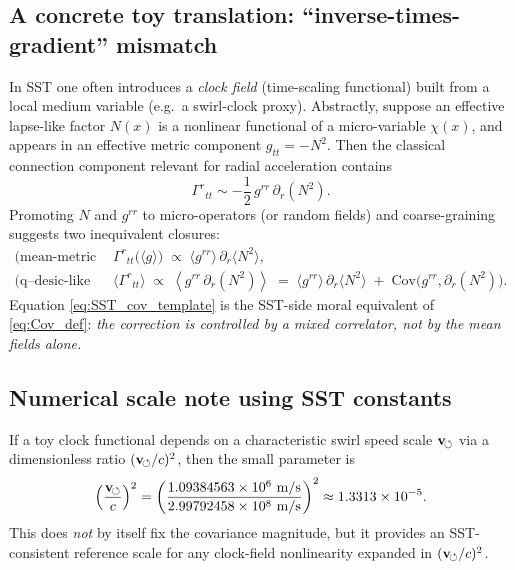 \documentclass[11pt,a4paper]{article}
\theoremstyle{thmstyleone}
\theoremstyle{thmstyletwo}
\theoremstyle{thmstylethree}
\begin{document}
        \subsection{A concrete toy translation: ``inverse-times-gradient'' mismatch}
            In SST one often introduces a \emph{clock field} (time-scaling functional) built from a local medium variable (e.g.\ a swirl-clock proxy).
            Abstractly, suppose an effective lapse-like factor $N(x)$ is a nonlinear functional of a micro-variable $\chi(x)$,
            and appears in an effective metric component $g_{tt}=-N^2$.
            Then the classical connection component relevant for radial acceleration contains
            \begin{equation}
                \Gamma^{r}{}_{tt} \sim -\frac{1}{2}\,g^{rr}\,\partial_r(N^2).
            \end{equation}
            Promoting $N$ and $g^{rr}$ to micro-operators (or random fields) and coarse-graining suggests two inequivalent closures:
            \begin{align}
                \text{(mean-metric closure)}\quad & \Gamma^{r}{}_{tt}\big(\langle g\rangle\big)
                \;\propto\; \langle g^{rr}\rangle\,\partial_r\langle N^2\rangle,
                \\
                \text{(q--desic-like closure)}\quad & \langle \Gamma^{r}{}_{tt}\rangle
                \;\propto\; \left\langle g^{rr}\,\partial_r(N^2)\right\rangle
                \;=\; \langle g^{rr}\rangle\,\partial_r\langle N^2\rangle
                \;+\;\mathrm{Cov}\!\big(g^{rr},\partial_r(N^2)\big).
                \label{eq:SST_cov_template}
            \end{align}
            Equation \eqref{eq:SST_cov_template} is the SST-side moral equivalent of \eqref{eq:Cov_def}:
            \emph{the correction is controlled by a mixed correlator, not by the mean fields alone.}

        \subsection{Numerical scale note using SST constants}
            If a toy clock functional depends on a characteristic swirl speed scale $\mathbf{v}_{\!\boldsymbol{\circlearrowleft}}$ via a dimensionless ratio $(\mathbf{v}_{\!\boldsymbol{\circlearrowleft}}/c)^2$,
            then the small parameter is
            \begin{equation}
                \left(\frac{\mathbf{v}_{\!\boldsymbol{\circlearrowleft}}}{c}\right)^2
                =
                \left(\frac{1.09384563\times 10^6~\mathrm{m/s}}{2.99792458\times 10^8~\mathrm{m/s}}\right)^2
                \approx 1.3313\times 10^{-5}.
            \end{equation}
            This does \emph{not} by itself fix the covariance magnitude, but it provides an SST-consistent reference scale for any clock-field
            nonlinearity expanded in $(\mathbf{v}_{\!\boldsymbol{\circlearrowleft}}/c)^2$.
\end{document}
